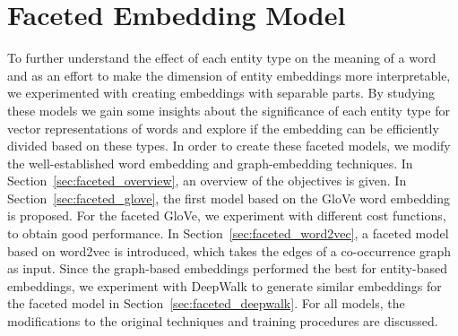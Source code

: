 \chapter{Faceted Embedding Model}\label{chap:faceted}
To further understand the effect of each entity type on the meaning of a word and as an effort to make the dimension of entity embeddings more interpretable, we experimented with creating embeddings with separable parts. By studying these models we gain some insights about the significance of each entity type for vector representations of words and explore if the embedding can be efficiently divided based on these types. In order to create these faceted models, we modify the well-established word embedding and graph-embedding techniques. In Section~\ref{sec:faceted_overview}, an overview of the objectives is given. In Section~\ref{sec:faceted_glove}, the first model based on the GloVe word embedding is proposed. For the faceted GloVe, we experiment with different cost functions, to obtain good performance. In Section~\ref{sec:faceted_word2vec}, a faceted model based on word2vec is introduced, which takes the edges of a co-occurrence graph as input. Since the graph-based embeddings performed the best for entity-based embeddings, we experiment with DeepWalk to generate similar embeddings for the faceted model in Section~\ref{sec:faceted_deepwalk}. For all models, the modifications to the original techniques and training procedures are discussed. 
